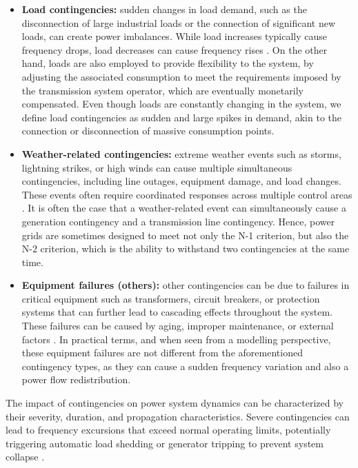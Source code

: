 \documentclass{article}
\begin{document}
\begin{itemize}
\item \textbf{Load contingencies:} sudden changes in load demand, such as the disconnection of large industrial loads or the connection of significant new loads, can create power imbalances. While load increases typically cause frequency drops, load decreases can cause frequency rises \cite{contingency:load}. On the other hand, loads are also employed to provide flexibility to the system, by adjusting the associated consumption to meet the requirements imposed by the transmission system operator, which are eventually monetarily compensated. Even though loads are constantly changing in the system, we define load contingencies as sudden and large spikes in demand, akin to the connection or disconnection of massive consumption points.

\item \textbf{Weather-related contingencies:} extreme weather events such as storms, lightning strikes, or high winds can cause multiple simultaneous contingencies, including line outages, equipment damage, and load changes. These events often require coordinated responses across multiple control areas \cite{contingency:weather}. It is often the case that a weather-related event can simultaneously cause a generation contingency and a transmission line contingency. Hence, power grids are sometimes designed to meet not only the N-1 criterion, but also the N-2 criterion, which is the ability to withstand two contingencies at the same time.

\item \textbf{Equipment failures (others):} other contingencies can be due to failures in critical equipment such as transformers, circuit breakers, or protection systems that can further lead to cascading effects throughout the system. These failures can be caused by aging, improper maintenance, or external factors \cite{li2006power}. In practical terms, and when seen from a modelling perspective, these equipment failures are not different from the aforementioned contingency types, as they can cause a sudden frequency variation and also a power flow redistribution. 

\end{itemize}

The impact of contingencies on power system dynamics can be characterized by their severity, duration, and propagation characteristics. Severe contingencies can lead to frequency excursions that exceed normal operating limits, potentially triggering automatic load shedding or generator tripping to prevent system collapse \cite{contingency:stability}.
\end{document}
